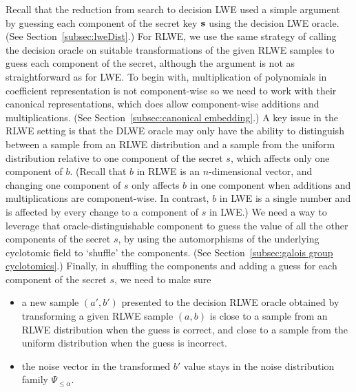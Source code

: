 \documentclass[../main.tex]{subfiles}
\begin{document}
Recall that the reduction from search to decision LWE used a simple argument by guessing each component of the secret key $\mathbf{s}$ using the decision LWE oracle. (See Section~\ref{subsec:lweDist}.)
For RLWE, we use the same strategy of calling the decision oracle on suitable transformations of the given RLWE samples to guess each component of the secret, although the argument is not as straightforward as for LWE. %
To begin with, multiplication of polynomials in coefficient representation is not component-wise so we need to work with their canonical representations, which does allow component-wise additions and multiplications. (See Section~\ref{subsec:canonical embedding}.)  
A key issue in the RLWE setting %
is that the DLWE oracle may only have the ability to distinguish between a sample from an RLWE distribution and a sample from the uniform distribution relative to one component of the secret $s$, which affects only one component of $b$. (Recall that $b$ in RLWE is an $n$-dimensional vector, and changing one component of $s$ only affects $b$ in one component when additions and multiplications are component-wise. In contrast, $b$ in LWE is a single number and is affected by every change to a component of $s$ in LWE.)
We need a way to leverage that oracle-distinguishable component to guess the value of all the other components of the secret $s$, %
by using the automorphisms of the underlying cyclotomic field to `shuffle' the components. (See Section~\ref{subsec:galois group cyclotomics}.)
Finally, in shuffling the components and adding a guess for each component of the secret $s$, we need to make sure 
\begin{itemize}\itemsep1mm\parskip0mm
\item a new sample $(a',b')$ presented to the decision RLWE oracle obtained by transforming a given RLWE sample $(a,b)$ is close to a sample from an RLWE distribution when the guess is correct, and close to a sample from the uniform distribution when the guess is incorrect. %
 \item the noise vector in the transformed $b'$ value stays in the noise distribution family $\Psi_{\le \alpha}$. %
\end{itemize}
\end{document}
